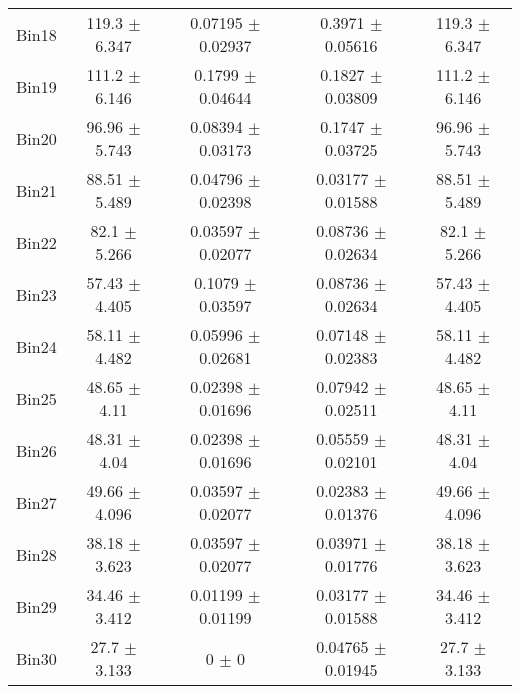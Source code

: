 \begin{tabular}{@{\extracolsep{4pt}}lcccc@{}}
     Bin18 & 119.3 $\pm$ 6.347 & 0.07195 $\pm$ 0.02937 & 0.3971 $\pm$ 0.05616 & 119.3 $\pm$ 6.347 \\ 
     Bin19 & 111.2 $\pm$ 6.146 & 0.1799 $\pm$ 0.04644 & 0.1827 $\pm$ 0.03809 & 111.2 $\pm$ 6.146 \\ 
     Bin20 & 96.96 $\pm$ 5.743 & 0.08394 $\pm$ 0.03173 & 0.1747 $\pm$ 0.03725 & 96.96 $\pm$ 5.743 \\ 
     Bin21 & 88.51 $\pm$ 5.489 & 0.04796 $\pm$ 0.02398 & 0.03177 $\pm$ 0.01588 & 88.51 $\pm$ 5.489 \\ 
     Bin22 & 82.1 $\pm$ 5.266 & 0.03597 $\pm$ 0.02077 & 0.08736 $\pm$ 0.02634 & 82.1 $\pm$ 5.266 \\ 
     Bin23 & 57.43 $\pm$ 4.405 & 0.1079 $\pm$ 0.03597 & 0.08736 $\pm$ 0.02634 & 57.43 $\pm$ 4.405 \\ 
     Bin24 & 58.11 $\pm$ 4.482 & 0.05996 $\pm$ 0.02681 & 0.07148 $\pm$ 0.02383 & 58.11 $\pm$ 4.482 \\ 
     Bin25 & 48.65 $\pm$ 4.11 & 0.02398 $\pm$ 0.01696 & 0.07942 $\pm$ 0.02511 & 48.65 $\pm$ 4.11 \\ 
     Bin26 & 48.31 $\pm$ 4.04 & 0.02398 $\pm$ 0.01696 & 0.05559 $\pm$ 0.02101 & 48.31 $\pm$ 4.04 \\ 
     Bin27 & 49.66 $\pm$ 4.096 & 0.03597 $\pm$ 0.02077 & 0.02383 $\pm$ 0.01376 & 49.66 $\pm$ 4.096 \\ 
     Bin28 & 38.18 $\pm$ 3.623 & 0.03597 $\pm$ 0.02077 & 0.03971 $\pm$ 0.01776 & 38.18 $\pm$ 3.623 \\ 
     Bin29 & 34.46 $\pm$ 3.412 & 0.01199 $\pm$ 0.01199 & 0.03177 $\pm$ 0.01588 & 34.46 $\pm$ 3.412 \\ 
     Bin30 & 27.7 $\pm$ 3.133 & 0 $\pm$ 0 & 0.04765 $\pm$ 0.01945 & 27.7 $\pm$ 3.133 \\ 
\hline\hline
  \end{tabular}
